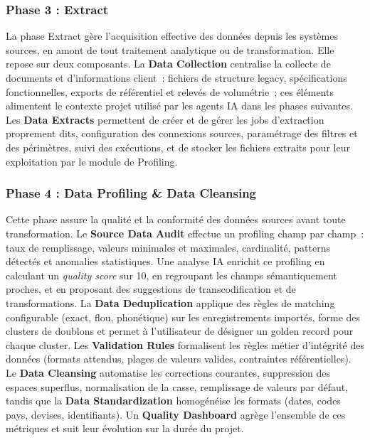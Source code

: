 \subsubsection*{Phase 3 : Extract}
\label{subsubsec:phase-extract}

La phase Extract gère l'acquisition effective des données depuis les systèmes sources, en amont de tout traitement analytique ou de transformation. Elle repose sur deux composants. La \textbf{Data Collection} centralise la collecte de documents et d'informations client~: fichiers de structure legacy, spécifications fonctionnelles, exports de référentiel et relevés de volumétrie~; ces éléments alimentent le contexte projet utilisé par les agents IA dans les phases suivantes. Les \textbf{Data Extracts} permettent de créer et de gérer les jobs d'extraction proprement dits, configuration des connexions sources, paramétrage des filtres et des périmètres, suivi des exécutions, et de stocker les fichiers extraits pour leur exploitation par le module de Profiling.

\subsubsection*{Phase 4 : Data Profiling \& Data Cleansing}
\label{subsubsec:phase-profiling}

Cette phase assure la qualité et la conformité des données sources avant toute transformation. Le \textbf{Source Data Audit} effectue un profiling champ par champ~: taux de remplissage, valeurs minimales et maximales, cardinalité, patterns détectés et anomalies statistiques. Une analyse IA enrichit ce profiling en calculant un \textit{quality score} sur 10, en regroupant les champs sémantiquement proches, et en proposant des suggestions de transcodification et de transformations. La \textbf{Data Deduplication} applique des règles de matching configurable (exact, flou, phonétique) sur les enregistrements importés, forme des clusters de doublons et permet à l'utilisateur de désigner un golden record pour chaque cluster. Les \textbf{Validation Rules} formalisent les règles métier d'intégrité des données (formats attendus, plages de valeurs valides, contraintes référentielles). Le \textbf{Data Cleansing} automatise les corrections courantes, suppression des espaces superflus, normalisation de la casse, remplissage de valeurs par défaut, tandis que la \textbf{Data Standardization} homogénéise les formats (dates, codes pays, devises, identifiants). Un \textbf{Quality Dashboard} agrège l'ensemble de ces métriques et suit leur évolution sur la durée du projet.

